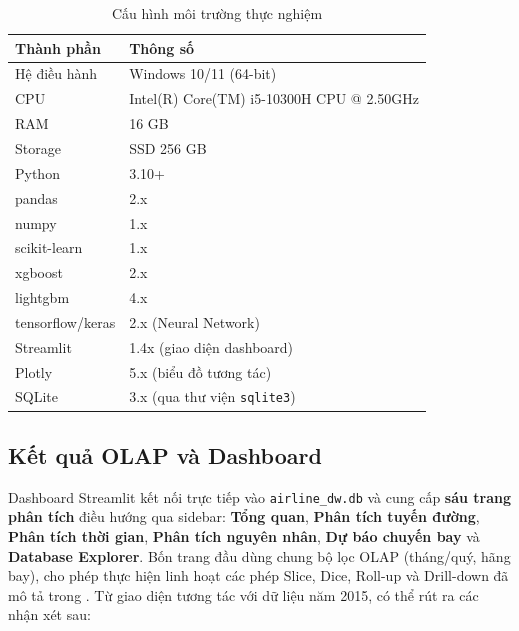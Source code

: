 \begin{table}[H]
\centering
\caption{Cấu hình môi trường thực nghiệm}
\vspace{4pt}
\begin{tabular}{|l|l|}
\hline
\textbf{Thành phần} & \textbf{Thông số} \\ \hline
Hệ điều hành   & Windows 10/11 (64-bit) \\ \hline
CPU            & Intel(R) Core(TM) i5-10300H CPU @ 2.50GHz \\ \hline
RAM            & 16 GB \\ \hline
Storage        & SSD 256 GB \\ \hline
Python         & 3.10+ \\ \hline
pandas         & 2.x \\ \hline
numpy          & 1.x \\ \hline
scikit-learn   & 1.x \\ \hline
xgboost        & 2.x \\ \hline
lightgbm       & 4.x \\ \hline
tensorflow/keras & 2.x (Neural Network) \\ \hline
Streamlit      & 1.4x (giao diện dashboard) \\ \hline
Plotly         & 5.x (biểu đồ tương tác) \\ \hline
SQLite         & 3.x (qua thư viện \texttt{sqlite3}) \\ \hline
\end{tabular}
\label{tab:environment}
\end{table}

% 



\subsection{Kết quả OLAP và Dashboard}

Dashboard Streamlit kết nối trực tiếp vào \texttt{airline\_dw.db}
và cung cấp \textbf{sáu trang phân tích} điều hướng qua sidebar:
\textbf{Tổng quan}, \textbf{Phân tích tuyến đường}, \textbf{Phân tích thời gian},
\textbf{Phân tích nguyên nhân}, \textbf{Dự báo chuyến bay} và \textbf{Database Explorer}.
Bốn trang đầu dùng chung bộ lọc OLAP (tháng/quý, hãng bay),
cho phép thực hiện linh hoạt các phép Slice, Dice, Roll-up và Drill-down
đã mô tả trong . Từ giao diện tương tác với dữ liệu năm 2015, có thể rút ra các nhận xét sau:

